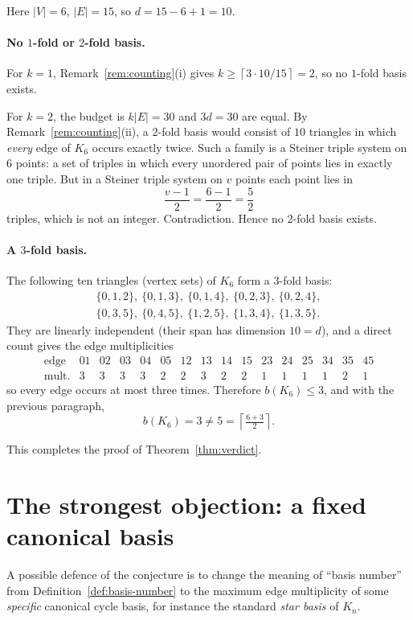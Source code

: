 \documentclass[11pt]{article}
\theoremstyle{definition}
\theoremstyle{remark}
\newcommand{\ceil}[1]{\left\lceil #1 \right\rceil}
\begin{document}
Here $|V|=6$, $|E|=15$, so $d=15-6+1=10$.

\paragraph{No $1$-fold or $2$-fold basis.}
For $k=1$, Remark~\ref{rem:counting}(i) gives
$k\ge\ceil{3\cdot 10/15}=2$, so no $1$-fold basis exists.

For $k=2$, the budget is $k|E|=30$ and $3d=30$ are equal. By
Remark~\ref{rem:counting}(ii), a $2$-fold basis would consist of $10$
triangles in which \emph{every} edge of $K_6$ occurs exactly twice. Such a
family is a Steiner triple system on $6$ points: a set of triples in which
every unordered pair of points lies in exactly one triple. But in a Steiner
triple system on $v$ points each point lies in
\[
  \frac{v-1}{2} = \frac{6-1}{2} = \frac{5}{2}
\]
triples, which is not an integer. Contradiction. Hence no $2$-fold basis
exists.

\paragraph{A $3$-fold basis.}
The following ten triangles (vertex sets) of $K_6$ form a $3$-fold basis:
\[
\begin{gathered}
\{0,1,2\},\ \{0,1,3\},\ \{0,1,4\},\ \{0,2,3\},\ \{0,2,4\},\\
\{0,3,5\},\ \{0,4,5\},\ \{1,2,5\},\ \{1,3,4\},\ \{1,3,5\}.
\end{gathered}
\]
They are linearly independent (their span has dimension $10=d$), and a direct
count gives the edge multiplicities
\[
  \begin{array}{c|ccccccccccccccc}
    \text{edge} & 01&02&03&04&05&12&13&14&15&23&24&25&34&35&45\\ \hline
    \text{mult.} & 3&3&3&3&2&2&3&2&2&1&1&1&1&2&1
  \end{array}
\]
so every edge occurs at most three times. Therefore $b(K_6)\le 3$, and with the
previous paragraph,
\[
  b(K_6)=3 \neq 5 = \ceil{\tfrac{6+3}{2}}.
\]

This completes the proof of Theorem~\ref{thm:verdict}.

\section{The strongest objection: a fixed canonical basis}

A possible defence of the conjecture is to change the meaning of ``basis
number'' from Definition~\ref{def:basis-number} to the maximum edge
multiplicity of some \emph{specific} canonical cycle basis, for instance the
standard \emph{star basis} of $K_n$.
\end{document}
